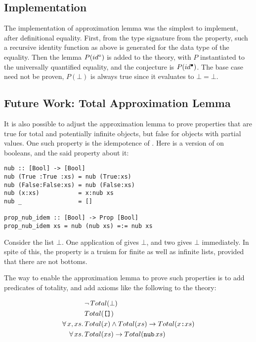 \subsection{Implementation} The implementation of approximation lemma
was the simplest to implement, after definitional equality. First,
from the type signature from the property, such a recursive identity
function as above is generated for the data type of the equality. Then
the lemma $P(id^{\circ})$ is added to the theory, with $P$
instantiated to the universally quantified equality, and the
conjecture is $P(id^{\bullet})$. The base case need not be proven,
$P(\bot)$ is always true since it evaluates to $\bot=\bot$.

\subsection{Future Work: Total Approximation Lemma}

It is also possible to adjust the approximation lemma to prove
properties that are true for total and potentially infinite objects,
but false for objects with partial values. One such property is the
idempotence of . Here is a version of  on booleans,
and the said property about it:

\begin{verbatim}
nub :: [Bool] -> [Bool]
nub (True :True :xs) = nub (True:xs)
nub (False:False:xs) = nub (False:xs)
nub (x:xs)           = x:nub xs
nub _                = []

prop_nub_idem :: [Bool] -> Prop [Bool]
prop_nub_idem xs = nub (nub xs) =:= nub xs
\end{verbatim}

Consider the list $\bot$. One application of 
gives $\bot$, and two gives $\bot$ immediately. In spite of
this, the property is a truism for finite as well as infinite lists,
provided that there are not bottoms.

The way to enable the approximation lemma to prove such properties is
to add predicates of totality, and add axioms like the following to
the theory:

\begin{align*}
            & \neg \, Total(\bot) \\
            & Total(\hs{[]}) \\
\faa{x}{xs} & Total(x) \wedge Total(xs) \rightarrow Total(x\hs{:}xs) \\
\fa{xs}     & Total(xs) \rightarrow Total(\hs{nub} \, xs) \\
\end{align*}

